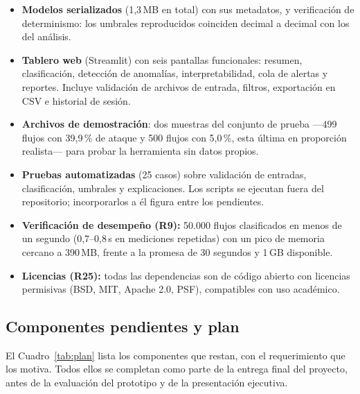 \documentclass[11pt,a4paper]{article}
\begin{document}
\begin{itemize}
\item \textbf{Modelos serializados} (1,3\,MB en total) con sus metadatos, y
verificación de determinismo: los umbrales reproducidos coinciden decimal a
decimal con los del análisis.
\item \textbf{Tablero web} (Streamlit) con seis pantallas funcionales:
resumen, clasificación, detección de anomalías, interpretabilidad, cola de
alertas y reportes. Incluye validación de archivos de entrada, filtros,
exportación en CSV e historial de sesión.
\item \textbf{Archivos de demostración}: dos muestras del conjunto de prueba
---499 flujos con 39,9\,\% de ataque y 500 flujos con 5,0\,\%, esta última en
proporción realista--- para probar la herramienta sin datos propios.
\item \textbf{Pruebas automatizadas} (25 casos) sobre validación de entradas,
clasificación, umbrales y explicaciones. Los scripts se ejecutan fuera del
repositorio; incorporarlos a él figura entre los pendientes.
\item \textbf{Verificación de desempeño (R9):} 50.000 flujos clasificados en
menos de un segundo (0,7--0,8\,s en mediciones repetidas) con un pico de
memoria cercano a 390\,MB, frente a la promesa de 30 segundos y 1\,GB
disponible.
\item \textbf{Licencias (R25):} todas las dependencias son de código abierto
con licencias permisivas (BSD, MIT, Apache 2.0, PSF), compatibles con uso
académico.
\end{itemize}

\subsection{Componentes pendientes y plan}

El Cuadro~\ref{tab:plan} lista los componentes que restan, con el
requerimiento que los motiva. Todos ellos se completan como parte de la
entrega final del proyecto, antes de la evaluación del prototipo y de la
presentación ejecutiva.
\end{document}
